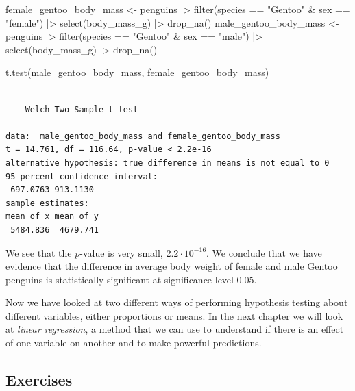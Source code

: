 \documentclass[
  letterpaper,
  DIV=11,
  numbers=noendperiod]{scrreprt}
\newenvironment{Shaded}{\begin{snugshade}}{\end{snugshade}}
\newcommand{\FunctionTok}[1]{\textcolor[rgb]{0.28,0.35,0.67}{#1}}
\newcommand{\NormalTok}[1]{\textcolor[rgb]{0.00,0.23,0.31}{#1}}
\newcommand{\OtherTok}[1]{\textcolor[rgb]{0.00,0.23,0.31}{#1}}
\newcommand{\SpecialCharTok}[1]{\textcolor[rgb]{0.37,0.37,0.37}{#1}}
\newcommand{\StringTok}[1]{\textcolor[rgb]{0.13,0.47,0.30}{#1}}
\begin{document}
\begin{Shaded}
\begin{Highlighting}[]
\NormalTok{female\_gentoo\_body\_mass }\OtherTok{\textless{}{-}}\NormalTok{ penguins }\SpecialCharTok{|\textgreater{}}
  \FunctionTok{filter}\NormalTok{(species }\SpecialCharTok{==} \StringTok{"Gentoo"} \SpecialCharTok{\&}\NormalTok{ sex }\SpecialCharTok{==} \StringTok{"female"}\NormalTok{) }\SpecialCharTok{|\textgreater{}}
  \FunctionTok{select}\NormalTok{(body\_mass\_g) }\SpecialCharTok{|\textgreater{}}
  \FunctionTok{drop\_na}\NormalTok{()}
\NormalTok{male\_gentoo\_body\_mass }\OtherTok{\textless{}{-}}\NormalTok{ penguins }\SpecialCharTok{|\textgreater{}}
  \FunctionTok{filter}\NormalTok{(species }\SpecialCharTok{==} \StringTok{"Gentoo"} \SpecialCharTok{\&}\NormalTok{ sex }\SpecialCharTok{==} \StringTok{"male"}\NormalTok{) }\SpecialCharTok{|\textgreater{}}
  \FunctionTok{select}\NormalTok{(body\_mass\_g) }\SpecialCharTok{|\textgreater{}}
  \FunctionTok{drop\_na}\NormalTok{()}

\FunctionTok{t.test}\NormalTok{(male\_gentoo\_body\_mass, female\_gentoo\_body\_mass)}
\end{Highlighting}
\end{Shaded}

\begin{verbatim}

    Welch Two Sample t-test

data:  male_gentoo_body_mass and female_gentoo_body_mass
t = 14.761, df = 116.64, p-value < 2.2e-16
alternative hypothesis: true difference in means is not equal to 0
95 percent confidence interval:
 697.0763 913.1130
sample estimates:
mean of x mean of y 
 5484.836  4679.741 
\end{verbatim}

We see that the \(p\)-value is very small, \(2.2 \cdot 10^{-16}\). We
conclude that we have evidence that the difference in average body
weight of female and male Gentoo penguins is statistically significant
at significance level 0.05.

Now we have looked at two different ways of performing hypothesis
testing about different variables, either proportions or means. In the
next chapter we will look at \emph{linear regression}, a method that we
can use to understand if there is an effect of one variable on another
and to make powerful predictions.

\subsection{Exercises}\label{exercises-10}
\end{document}
